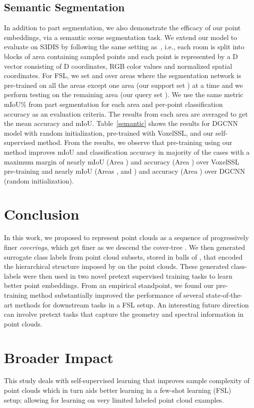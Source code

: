 \documentclass{article}
\begin{document}
\subsection{Semantic Segmentation}
In addition to part segmentation, we also demonstrate the efficacy of our point embeddings, via a semantic scene segmentation task. We extend our model to evaluate on S3DIS by following the same setting as~\cite{qi2017pointnet}, i.e., each room is split into blocks of area  containing  sampled points and each point is represented by a D vector consisting of D coordinates, RGB color values and normalized spatial coordinates. For FSL, we set  and  over  areas where the segmentation network is pre-trained on all the areas except one area (our support set ) at a time and we perform testing on the remaining area (our query set ). We use the same metric mIoU\% from part segmentation for each area and per-point classification accuracy as an evaluation criteria. The results from each area are averaged to get the mean accuracy and mIoU. Table~\ref{semantic} shows the results for DGCNN model with random initialization, pre-trained with VoxelSSL, and our self-supervised method. From the results, we observe that pre-training using our method improves mIoU and classification accuracy in majority of the cases with a maximum margin of nearly  mIoU (Area ) and  accuracy (Area ) over VoxelSSL pre-training and nearly  mIoU (Areas ,  and ) and  accuracy (Area ) over DGCNN (random initialization).



\section{Conclusion}
In this work, we proposed to represent point clouds as a sequence of progressively finer \emph{coverings}, which get finer as we descend the cover-tree . 
We then generated surrogate class labels from point cloud subsets, stored in balls of , that encoded the hierarchical structure imposed by  on the point clouds. These generated class-labels were then used in two novel pretext supervised training tasks to learn better point embeddings. 
From an empirical standpoint, we found our pre-training method substantially improved the performance of several state-of-the-art methods for downstream tasks in a FSL setup.
An interesting future direction can involve pretext tasks that capture the geometry and spectral information in point clouds.
\clearpage
\medskip


\section*{Broader Impact}
This study deals with self-supervised learning that improves sample complexity of point clouds which in turn aids better learning in a few-shot learning (FSL) setup; allowing for learning on very limited labeled point cloud examples.
\end{document}
